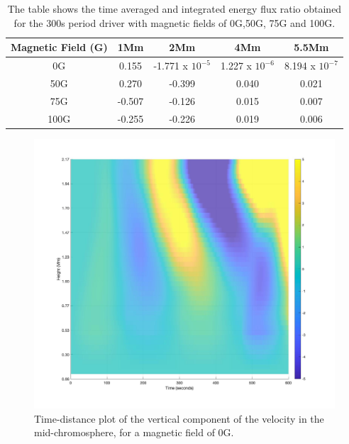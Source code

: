 \documentclass[physics,article,submit,pdftex,moreauthors]{Definitions/mdpi}
\begin{document}
\begin{table}\label{energyflux}
\centering
\begin{tabular}{c c c c c}
\hline
Magnetic Field (G)   &  1Mm  &  2Mm &  4Mm & 5.5Mm \\
\hline
0G & 0.155  &    -1.771 x $10^{-5}$      &   1.227 x $10^{-6}$     &   8.194 x $10^{-7}$      \\
\hline
50G & 0.270  &   -0.399       &   0.040      &  0.021     \\
\hline
75G & -0.507  &    -0.126      &   0.015     &   0.007      \\
\hline
100G & -0.255  &   -0.226      &   0.019      &   0.006    \\
\hline

\end{tabular} 
\caption{The table shows the time averaged and integrated energy flux ratio obtained  for the 300s period driver with magnetic fields of 0G,50G, 75G and 100G.}
\label{energyfluxratio}
\end{table}


 





\begin{figure}
\centering
\label{td_vert_dif_bv0G_100G_300}
\includegraphics[scale=0.2]{td_vert_bv0G_300.jpg}
\caption{Time-distance plot of the vertical component of the velocity in the mid-chromosphere, for a magnetic field of 0G.}
\end{figure}
\end{document}
